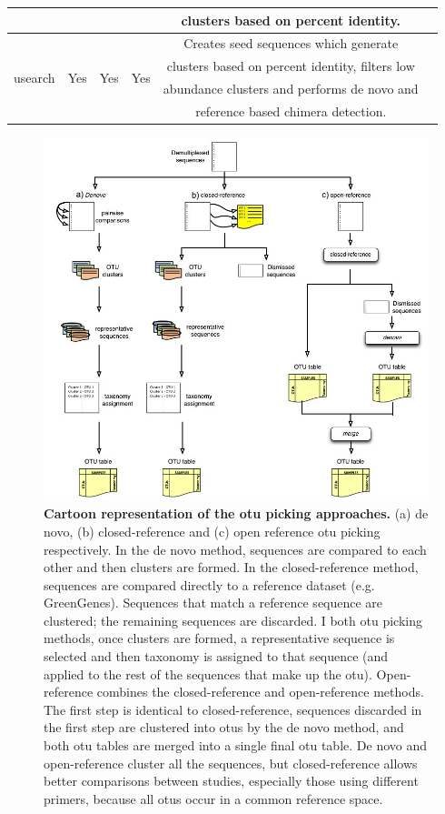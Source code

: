 \begin{table}[htbp]
\begin{tabular*}{\textwidth}{cccccc}
& & & & clusters based on percent identity. & \\
\midrule
\multirow{4}{*}{usearch} & \multirow{4}{*}{Yes} & \multirow{4}{*}{Yes} & \multirow{4}{*}{Yes} & Creates seed sequences which generate & \multirow{4}{*}{\cite{Edgar2010}}\\
& & & & clusters based on percent identity, filters low & \\
& & & & abundance clusters and performs de novo and & \\
& & & & reference based chimera detection. & \\
\bottomrule
\end{tabular*}
\end{table}
\renewcommand{\arraystretch}{1}%

\begin{figure}[htbp]
\includegraphics[width=0.75\columnwidth]{chapter_book_figures/Figure_2.jpg}
\caption[Cartoon representation of the \gls{otu} picking approaches]{\textbf{Cartoon representation of the \gls{otu} picking approaches.}
(a) de novo, (b) closed-reference and (c) open reference \gls{otu} picking respectively.
In the de novo method, sequences are compared to each other and then clusters are formed.
In the closed-reference method, sequences are compared directly to a reference dataset (e.g. GreenGenes).
Sequences that match a reference sequence are clustered; the remaining sequences are discarded. I
both \gls{otu} picking methods, once clusters are formed, a representative sequence is selected and
then taxonomy is assigned to that sequence (and applied to the rest of the sequences that make up the \gls{otu}).
Open-reference combines the closed-reference and open-reference methods. The first step is identical to
closed-reference, sequences discarded in the first step are clustered into \gls{otu}s by the de novo method,
and both \gls{otu} tables are merged into a single final \gls{otu} table. De novo and open-reference cluster all
the sequences, but closed-reference allows better comparisons between studies, especially those using
different primers, because all \gls{otu}s occur in a common reference space.}
\label{bfigure2}
\end{figure}

